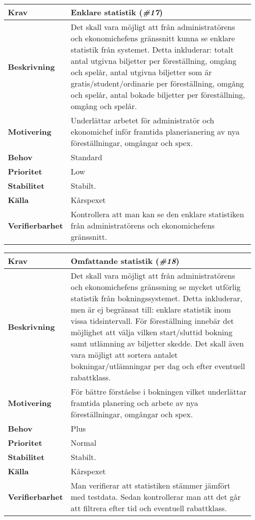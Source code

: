\documentclass[a4paper, twoside, 11pt, titlepage]{article}
\begin{document}
	\begin{tabular} { p{2.6cm} p{12.5cm} }
		\hline
		\sffamily\textbf{Krav} & Enklare statistik  (\emph{\#17})  \\
		\hline
		\sffamily\textbf{Beskrivning} & Det skall vara möjligt att från administratörens och ekonomichefens gränssnitt kunna se enklare statistik från systemet. Detta inkluderar: totalt antal utgivna biljetter per föreställning, omgång och spelår, antal utgivna biljetter som är gratis/student/ordinarie per föreställning, omgång och spelår, antal bokade biljetter per föreställning, omgång och spelår.   \\
		\hline
		\sffamily\textbf{Motivering} & Underlättar arbetet för administratör och ekonomichef inför framtida planerianering av nya föreställningar, omgångar och spex.  \\
		\hline
		\sffamily\textbf{Behov} & Standard  \\
		\hline
		\sffamily\textbf{Prioritet} & Low  \\
		\hline
		\sffamily\textbf{Stabilitet} & Stabilt.  \\
		\hline
		\sffamily\textbf{Källa} & Kårspexet  \\
		\hline
		\sffamily\textbf{Verifierbarhet} & Kontrollera att man kan se den enklare statistiken från administratörens och ekonomichefens gränssnitt.  \\
		\hline
	\end{tabular}
	\vspace{6mm}

	\begin{tabular} { p{2.6cm} p{12.5cm} }
		\hline
		\sffamily\textbf{Krav} & Omfattande statistik (\emph{\#18})  \\
		\hline
		\sffamily\textbf{Beskrivning} & Det skall vara möjligt att från administratörens och ekonomichefens gränssning se mycket utförlig statistik från bokningssystemet. Detta inkluderar, men är ej begränsat till: enklare statistik inom vissa tidsintervall. För föreställning innebär det möjlighet att välja vilken start/sluttid bokning samt utlämning av biljetter skedde. Det skall även vara möjligt att sortera antalet bokningar/utlämningar per dag och efter eventuell rabattklass.  \\
		\hline
		\sffamily\textbf{Motivering} & För bättre förståelse i bokningen vilket underlättar framtida planering och arbete av nya föreställningar, omgångar och spex.  \\
		\hline
		\sffamily\textbf{Behov} & Plus  \\
		\hline
		\sffamily\textbf{Prioritet} & Normal  \\
		\hline
		\sffamily\textbf{Stabilitet} & Stabilt.  \\
		\hline
		\sffamily\textbf{Källa} & Kårspexet  \\
		\hline
		\sffamily\textbf{Verifierbarhet} & Man verifierar att statistiken stämmer jämfört med testdata. Sedan kontrollerar man att det går att filtrera efter tid och eventuell rabattklass.  \\
		\hline
	\end{tabular}
	\vspace{6mm}
\end{document}
